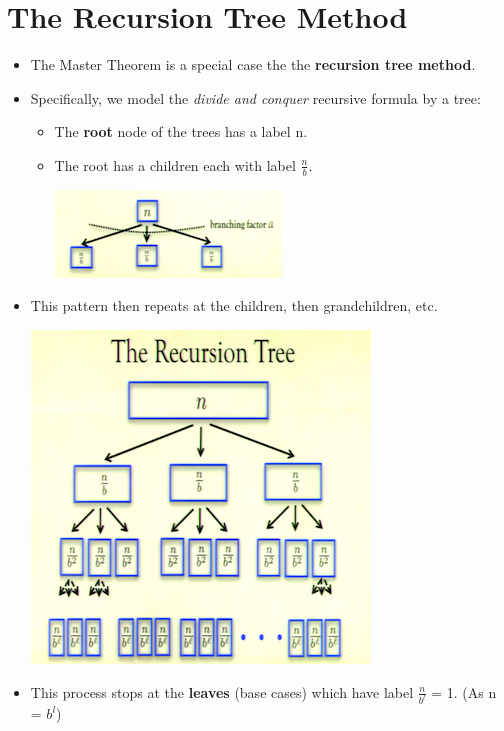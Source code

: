 \documentclass[12pt]{article}
\begin{document}
\section{The Recursion Tree Method}
\begin{itemize}
\item The Master Theorem is a special case the the \textbf{recursion tree method}.
\item Specifically, we model the \textit{divide and conquer} recursive formula by a tree:

 \hspace*{\fill} 

	\begin{itemize}
	\item The \textbf{root} node of the trees has a label n.
	\item The root has a children each with label {\large $\frac{n}{b}$}.
	\begin{center}
	\includegraphics{lecture3l}
	\end{center}
	\end{itemize}
\item This pattern then repeats at the children, then grandchildren, etc.
\begin{center}
\includegraphics{lecture3m}
\end{center}
\item This process stops at the \textbf{leaves} (base cases) which have label $\frac{n}{b^{l}}$ = 1. (As n = $b^l$)

\end{itemize}
\end{document}
